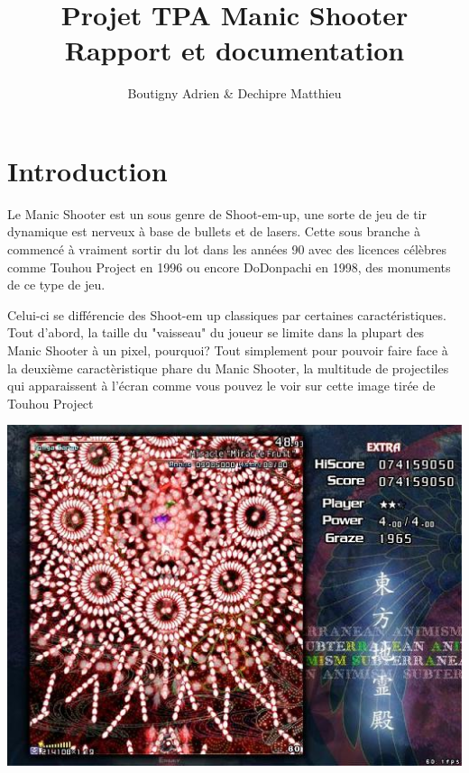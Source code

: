 \documentclass{article}
\begin{document}
\title{Projet TPA Manic Shooter \\ Rapport et documentation}
\author{Boutigny Adrien \& Dechipre Matthieu}
\maketitle

\newpage

\tableofcontents

\newpage

\section{Introduction}

Le Manic Shooter est un sous genre de Shoot-em-up, une sorte de jeu de tir
dynamique est nerveux à base de bullets et de lasers. Cette sous branche à
commencé à vraiment sortir du lot dans les années 90 avec des licences célèbres
comme Touhou Project en 1996 ou encore DoDonpachi en 1998, des monuments de ce
type de jeu. \newline

Celui-ci se différencie des Shoot-em up classiques par certaines
caractéristiques. Tout d'abord, la taille du "vaisseau" du joueur se limite dans
la plupart des Manic Shooter à un pixel, pourquoi? Tout simplement pour pouvoir
faire face à la deuxième caractèristique phare du Manic Shooter, la multitude de
projectiles qui apparaissent à l'écran comme vous pouvez le voir sur cette image
tirée de Touhou Project

\begin{center}
\includegraphics[scale=0.75]{images/touhou_project.jpg}
\end{center}
\end{document}
